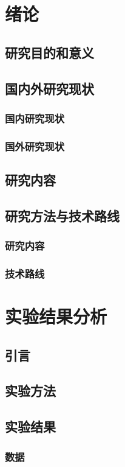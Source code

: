 \documentclass{ctexbook}
\begin{document}
    \tableofcontents

    \chapter{绪论}
    \section{研究目的和意义}
    \section{国内外研究现状}
    \subsection{国内研究现状}
    \subsection{国外研究现状}
    \section{研究内容}
    \section{研究方法与技术路线}
    \subsection{研究内容}
    \subsection{技术路线}

    \chapter{实验结果分析}
    \section{引言}
    \section{实验方法}
    \section{实验结果}
    \subsection{数据}
\end{document}
